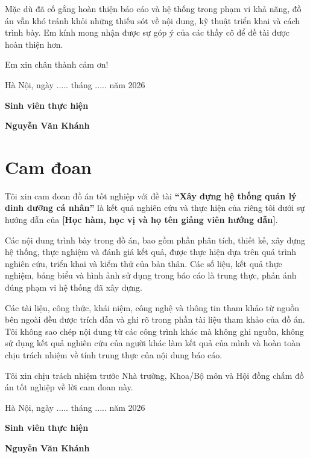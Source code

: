 \documentclass[12pt, a4paper]{report}
\begin{document}
Mặc dù đã cố gắng hoàn thiện báo cáo và hệ thống trong phạm vi khả năng, đồ án vẫn khó tránh khỏi những thiếu sót về nội dung, kỹ thuật triển khai và cách trình bày. Em kính mong nhận được sự góp ý của các thầy cô để đề tài được hoàn thiện hơn.

Em xin chân thành cảm ơn!

Hà Nội, ngày ..... tháng ..... năm 2026

\textbf{Sinh viên thực hiện}

\textbf{Nguyễn Văn Khánh}


\chapter*{Cam đoan}
Tôi xin cam đoan đồ án tốt nghiệp với đề tài \textbf{“Xây dựng hệ thống quản lý dinh dưỡng cá nhân”} là kết quả nghiên cứu và thực hiện của riêng tôi dưới sự hướng dẫn của \textbf{[Học hàm, học vị và họ tên giảng viên hướng dẫn]}.

Các nội dung trình bày trong đồ án, bao gồm phần phân tích, thiết kế, xây dựng hệ thống, thực nghiệm và đánh giá kết quả, được thực hiện dựa trên quá trình nghiên cứu, triển khai và kiểm thử của bản thân. Các số liệu, kết quả thực nghiệm, bảng biểu và hình ảnh sử dụng trong báo cáo là trung thực, phản ánh đúng phạm vi hệ thống đã xây dựng.

Các tài liệu, công thức, khái niệm, công nghệ và thông tin tham khảo từ nguồn bên ngoài đều được trích dẫn và ghi rõ trong phần tài liệu tham khảo của đồ án. Tôi không sao chép nội dung từ các công trình khác mà không ghi nguồn, không sử dụng kết quả nghiên cứu của người khác làm kết quả của mình và hoàn toàn chịu trách nhiệm về tính trung thực của nội dung báo cáo.

Tôi xin chịu trách nhiệm trước Nhà trường, Khoa/Bộ môn và Hội đồng chấm đồ án tốt nghiệp về lời cam đoan này.

Hà Nội, ngày ..... tháng ..... năm 2026

\textbf{Sinh viên thực hiện}

\textbf{Nguyễn Văn Khánh}

		
\clearpage
\renewcommand{\contentsname}{\centering MỤC LỤC}
\tableofcontents
\clearpage

\renewcommand{\listtablename}{\centering DANH MỤC BẢNG BIỂU}
\listoftables
\clearpage

\renewcommand{\listfigurename}{\centering DANH MỤC HÌNH ẢNH}
\listoffigures
\clearpage
\end{document}
